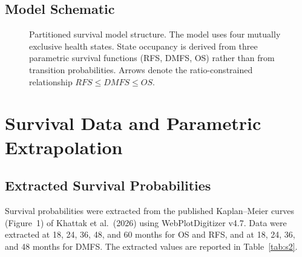 \documentclass[11pt,a4paper]{article}
\begin{document}
\subsection{Model Schematic}
\label{sec:s1diagram}
\begin{figure}[H]
\centering
{}
\caption{Partitioned survival model structure. The model uses four mutually exclusive health states. State occupancy is derived from three parametric survival functions (RFS, DMFS, OS) rather than from transition probabilities. Arrows denote the ratio-constrained relationship $RFS \leq DMFS \leq OS$.}
\label{fig:s1}
\end{figure}

\section{Survival Data and Parametric Extrapolation}

\subsection{Extracted Survival Probabilities}
\label{sec:survival_data}

Survival probabilities were extracted from the published Kaplan--Meier curves (Figure~1) of Khattak et al.\ (2026) \cite{khattak2026} using WebPlotDigitizer v4.7. Data were extracted at 18, 24, 36, 48, and 60 months for OS and RFS, and at 18, 24, 36, and 48 months for DMFS. The extracted values are reported in Table~\ref{tab:s2}.
\end{document}
